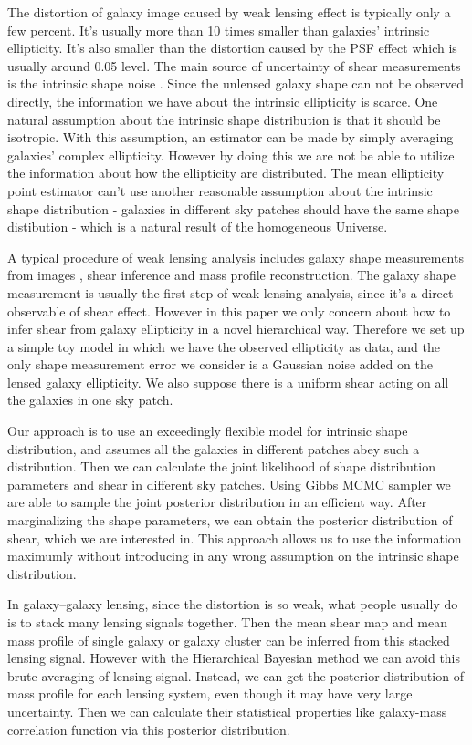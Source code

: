 \documentclass[useAMS,usenatbib]{mn2e}
\begin{document}
The distortion of galaxy image caused by weak lensing effect is typically only a few percent.
It's usually more than 10 times smaller than galaxies' intrinsic ellipticity. It's also smaller than the distortion caused
by the PSF effect which is usually around 0.05 level. The main source of uncertainty of shear measurements is the intrinsic shape noise
. Since the unlensed galaxy shape can not be observed directly, the information
we have about the intrinsic ellipticity is scarce. One natural assumption about the intrinsic shape distribution is that 
it should be isotropic. With this assumption, an estimator can be made by simply averaging galaxies' complex
ellipticity. However by doing this we are not be able to utilize the
information about how the ellipticity are distributed. The mean ellipticity
point estimator can't use another reasonable assumption about the intrinsic shape distribution - galaxies in different sky patches should have
the same shape distibution - which is a natural result of the homogeneous Universe.

A typical procedure of weak lensing analysis  includes galaxy shape measurements from images
, shear inference and mass profile reconstruction. The galaxy shape measurement is usually the
first step of weak lensing analysis, since it's a direct observable of shear effect. However
in this paper we only concern about how to infer shear from galaxy
ellipticity in a novel hierarchical way. Therefore we set up a simple toy model in which we have the observed ellipticity as
data, and the only shape measurement error we consider is a Gaussian noise
added on the lensed galaxy ellipticity. We also suppose there is a uniform shear
acting on all the galaxies in one sky patch.

Our approach is to use an exceedingly flexible model for intrinsic
shape distribution, and assumes all the galaxies in different patches
abey such a distribution. Then we can calculate the joint likelihood
of shape distribution parameters and shear in different sky patches. Using
 Gibbs MCMC sampler we are able to sample the joint posterior distribution
in an efficient way. After marginalizing the shape parameters, we can obtain
the posterior distribution of shear, which we are interested in. This
approach allows us to use the information maximumly without introducing
in any wrong assumption on the intrinsic shape distribution.

In galaxy--galaxy lensing, since the distortion is so weak, what people
usually do is to stack many lensing signals together. Then the mean
shear map and mean mass profile of single galaxy or galaxy
cluster can be inferred from this stacked lensing signal. However with the Hierarchical Bayesian method we can avoid this brute averaging
of lensing signal. Instead, we can get the posterior distribution of mass profile for
each lensing system, even though it may have very large uncertainty. Then we
can calculate their statistical properties like galaxy-mass correlation
function via this posterior distribution.
\end{document}
